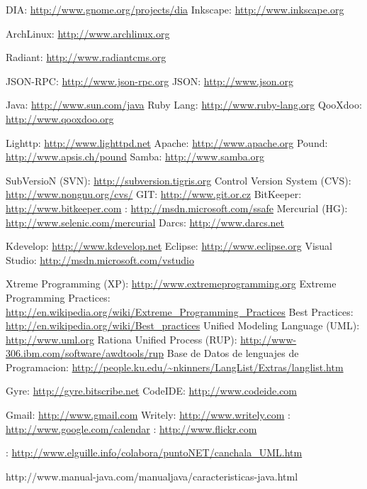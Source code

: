 \begin{thebibliography}{99}

 DIA: \url{http://www.gnome.org/projects/dia}
 Inkscape: \url{http://www.inkscape.org}

 ArchLinux: \url{http://www.archlinux.org}

 Radiant: \url{http://www.radiantcms.org}

 JSON-RPC: \url{http://www.json-rpc.org}
 JSON: \url{http://www.json.org}

 Java: \url{http://www.sun.com/java}
 Ruby Lang: \url{http://www.ruby-lang.org}
 QooXdoo: \url{http://www.qooxdoo.org}

 Lighttp: \url{http://www.lighttpd.net}
 Apache: \url{http://www.apache.org}
 Pound: \url{http://www.apsis.ch/pound}
 Samba: \url{http://www.samba.org}

 SubVersioN (SVN): \url{http://subversion.tigris.org}
 Control Version System (CVS): \url{http://www.nongnu.org/cvs/}
 GIT: \url{http://www.git.or.cz}
 BitKeeper: \url{http://www.bitkeeper.com}
 : \url{http://msdn.microsoft.com/ssafe}
 Mercurial (HG): \url{http://www.selenic.com/mercurial}
 Darcs: \url{http://www.darcs.net}

 Kdevelop: \url{http://www.kdevelop.net}
 Eclipse: \url{http://www.eclipse.org}
 Visual Studio: \url{http://msdn.microsoft.com/vstudio}

 Xtreme Programming (XP): \url{http://www.extremeprogramming.org}
 Extreme Programming Practices:
	\url{http://en.wikipedia.org/wiki/Extreme_Programming_Practices}
 Best Practices: \url{http://en.wikipedia.org/wiki/Best_practices}
 Unified Modeling Language (UML): \url{http://www.uml.org}
 Rationa Unified Process (RUP): \url{http://www-306.ibm.com/software/awdtools/rup}
 Base de Datos de lenguajes de Programacion:
	\url{http://people.ku.edu/~nkinners/LangList/Extras/langlist.htm}

 Gyre: \url{http://gyre.bitscribe.net}
 CodeIDE: \url{http://www.codeide.com}

 Gmail: \url{http://www.gmail.com}
 Writely: \url{http://www.writely.com}
 : \url{http://www.google.com/calendar}
 : \url{http://www.flickr.com}

 : \url{http://www.elguille.info/colabora/puntoNET/canchala_UML.htm}


http://www.manual-java.com/manualjava/caracteristicas-java.html

\end{thebibliography}

